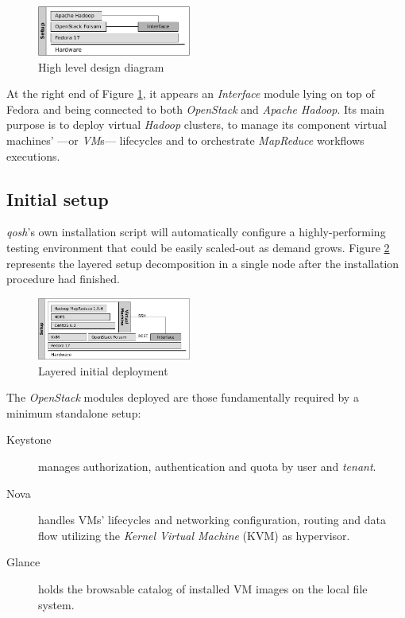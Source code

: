 \documentclass{sig-alternate}
\begin{document}
\begin{figure}[tbp]
\centering
\includegraphics[width=0.45\textwidth]{img/002}
\caption{High level design diagram}
\label{fig:arch1}
\end{figure}



At the right end of Figure \ref{fig:arch1}, it appears an \emph{Interface} module lying on top of Fedora and being connected to both \emph{OpenStack} and \emph{Apache Hadoop}. Its main purpose is to deploy virtual \emph{Hadoop} clusters, to manage its component virtual machines' ---or \emph{VM}s--- lifecycles and to orchestrate \emph{MapReduce} workflows executions.



\subsection{Initial setup}
\noindent \emph{qosh}'s own installation script will automatically configure a highly-performing testing environment that could be easily scaled-out as demand grows. Figure \ref{fig:initial} represents the layered setup decomposition in a single node after the installation procedure had finished.

\begin{figure}[tbp]
\centering
\includegraphics[width=0.45\textwidth]{img/005}
\caption{Layered initial deployment}
\label{fig:initial}
\end{figure}

The \emph{OpenStack} modules deployed are those fundamentally required by a minimum standalone setup:

\begin{description}
 \item[Keystone] manages authorization, authentication and quota by user and \emph{tenant}.
 \item[Nova] handles VMs' lifecycles and networking configuration, routing and data flow utilizing the \emph{Kernel Virtual Machine} (KVM) as hypervisor.
 \item[Glance] holds the browsable catalog of installed VM images on the local file system.
\end{description}
\end{document}

